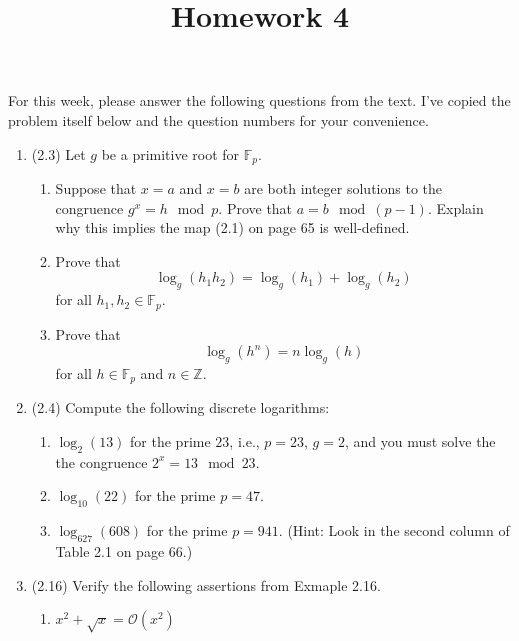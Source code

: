 \documentclass[12pt]{amsart}
\theoremstyle{definition}
\begin{document}
\title{Homework 4}

\maketitle

For this week, please answer the following questions from the text. 
I've copied the problem itself below and the question numbers for 
your convenience. 

\begin{enumerate}
	\item (2.3) Let $g$ be a primitive root for $\mathbb{F}_p$.
	\begin{enumerate}
		\item Suppose that $x=a$ and $x=b$ are both integer solutions to the congruence 
			$g^x = h \mod p$. Prove that $a = b \mod (p-1)$. Explain why this implies 
			the map (2.1) on page 65 is well-defined. 
		\item Prove that 
		\begin{displaymath}
			\log_g(h_1 h_2) = \log_g(h_1) + \log_g(h_2) 
		\end{displaymath}
		for all $h_1,h_2 \in \mathbb{F}_p$.
		\item Prove that 
		\begin{displaymath}
			\log_g(h^n) = n\log_g(h) 
		\end{displaymath}
		for all $h \in \mathbb{F}_p$ and $n \in \mathbb{Z}$.
	\end{enumerate}
\item (2.4) Compute the following discrete logarithms:
\begin{enumerate}
\item $\log_2(13)$ for the prime $23$, i.e., $p=23$, $g=2$, and you must solve the the 
	congruence $2^x = 13 \mod 23$. 
\item $\log_{10}(22)$ for the prime $p=47$. 
\item $\log_{627}(608)$ for the prime $p=941$. (Hint: Look in the second column of Table 2.1 on page 66.) 
\end{enumerate}
\item (2.16) Verify the following assertions from Exmaple 2.16. 
	\begin{enumerate}
		\item $x^2 + \sqrt{x} = \mathcal O(x^2)$

\end{enumerate}
\end{enumerate}
\end{document}
